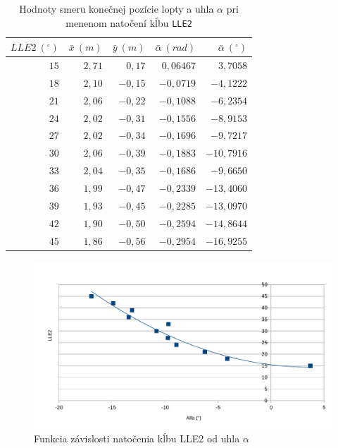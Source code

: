 \begin{table}[H] 
  \centering
  \begin{tabular}{||r||r|r||r|r||}
  	\hline
    \hline
   	$LLE2~(^{\circ})$ & $\bar{x}~(m)$ & $\bar{y}~(m)$ & $\bar{\alpha}~(rad)$ & $\bar{\alpha}~(^{\circ})$\\
   	\hline
   	\hline
   	$15$ & $2,71$ & $0,17$ & $0,06467$ & $3,7058$\\
   	\hline
 	$18$ & $2,10$ & $-0,15$ & $-0,0719$ & $-4,1222$ \\
 	\hline
 	$21$ & $2,06$ & $-0,22$ & $-0,1088$ & $-6,2354$ \\
 	\hline
 	$24$ & $2,02$ & $-0,31$ & $-0,1556$ & $-8,9153$ \\
 	\hline
 	$27$ & $2,02$ & $-0,34$ & $-0,1696$ & $-9,7217$ \\
 	\hline
 	$30$ & $2,06$ & $-0,39$ & $-0,1883$ & $-10,7916$\\
 	\hline
 	$33$ & $2,04$ & $-0,35$ & $-0,1686$ & $-9,6650$ \\
	 \hline
 	$36$ & $1,99$ & $-0,47$ & $-0,2339$ & $-13,4060$ \\
 	\hline
 	$39$ & $1,93$ & $-0,45$ & $-0,2285$ & $-13,0970$ \\
 	\hline
 	$42$ & $1,90$ & $-0,50$ & $-0,2594$ & $-14,8644$ \\
 	\hline
	 $45$ & $1,86$ & $-0,56$ & $-0,2954$ & $-16,9255$ \\
 	\hline
 	\hline
  \end{tabular}
  \caption{Hodnoty smeru konečnej pozície lopty a uhla $\alpha$ pri menenom natočení kĺbu \texttt{LLE2}}
  \label{tab_lle2}
\end{table}

\begin{figure}[H]
	\centering
	\includegraphics[scale=0.7]{./data/graf_zavislost_LLE2_od_alfa}
	\caption{Funkcia závislosti natočenia kĺbu LLE2 od uhla $\alpha$}
	\label{pic_LLE2_dependency_alpha}
\end{figure}

